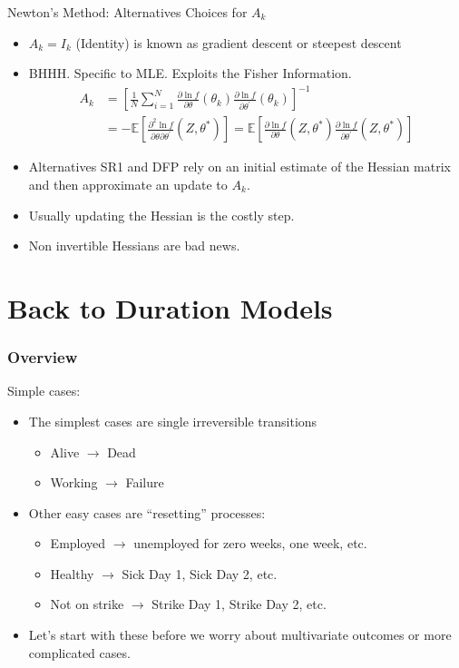 \documentclass[aspectratio=169]{beamer}
\begin{document}
\begin{frame}{Newton's Method: Alternatives}
Choices for $A_k$
\begin{itemize}
\item $A_k= I_{k}$ (Identity) is known as \alert{gradient descent} or \alert{steepest descent}
\item BHHH. Specific to MLE. Exploits the \alert{Fisher Information}.
\begin{align*}
A _ { k } 
&= \left[ \frac { 1 } { N } \sum _ { i = 1 } ^ { N } \frac { \partial \ln f } { \partial \theta } \left( \theta _ { k } \right) \frac { \partial \ln f } { \partial \theta ^ { \prime } } \left( \theta _ { k } \right) \right] ^ { - 1 }\\
&=- \mathbb { E } \left[ \frac { \partial ^ { 2 } \ln f } { \partial \theta \partial \theta ^ { \prime } } \left( Z , \theta ^ { * } \right) \right] 
= \mathbb { E } \left[ \frac { \partial \ln f } { \partial \theta } \left( Z , \theta ^ { * } \right) \frac { \partial \ln f } { \partial \theta ^ { \prime } } \left( Z , \theta ^ { * } \right) \right]
\end{align*}
\item Alternatives \alert{SR1} and \alert{DFP} rely on an initial estimate of the Hessian matrix and then approximate an update to $A_k$.
\item Usually updating the Hessian is the costly step.
\item Non invertible Hessians are bad news.
\end{itemize}
\end{frame}

\section{Back to Duration Models}

\begin{frame}
\frametitle{Overview}
Simple cases:
\begin{itemize}
\item The simplest cases are single irreversible transitions
\begin{itemize}
\item Alive $\rightarrow$ Dead
\item Working $\rightarrow$ Failure
\end{itemize}
\item Other easy cases are ``resetting'' processes:
\begin{itemize}
\item Employed $\rightarrow$ unemployed for zero weeks, one week, etc.
\item Healthy $\rightarrow$ Sick Day 1, Sick Day 2, etc.
\item Not on strike $\rightarrow$ Strike Day 1, Strike Day 2, etc.
\end{itemize}
\item Let's start with these before we worry about multivariate outcomes or more complicated cases.
\end{itemize}
\end{frame}
\end{document}
